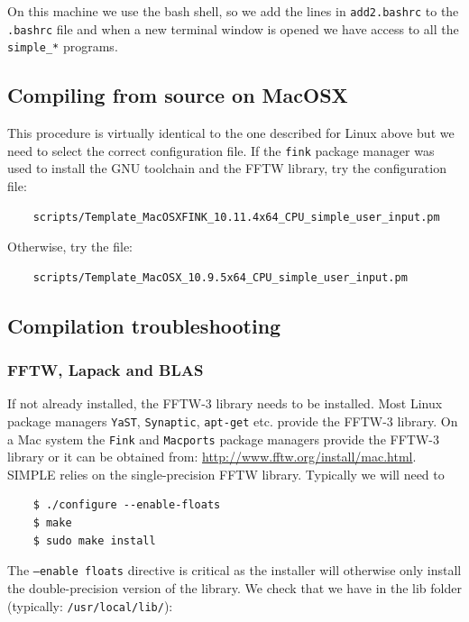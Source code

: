 \documentclass[a4paper,11pt]{article}
\begin{document}
On this machine we use the bash shell, so we add the lines in \texttt{add2.bashrc} to the \texttt{.bashrc} file and when a new terminal window is opened we have access to all the \texttt{simple\_*} programs.

\subsection{Compiling from source on MacOSX}
\label{compilemac}

This procedure is virtually identical to the one described for Linux above but we need to select the correct configuration file. If the \texttt{fink} package manager was used to install the GNU toolchain and the FFTW library, try the configuration file:
\begin{verbatim}
    scripts/Template_MacOSXFINK_10.11.4x64_CPU_simple_user_input.pm
\end{verbatim}
 Otherwise, try the file:
\begin{verbatim}
    scripts/Template_MacOSX_10.9.5x64_CPU_simple_user_input.pm
\end{verbatim}

\subsection{Compilation troubleshooting}
\label{compiletrouble}

\subsubsection{FFTW, Lapack and BLAS}

If not already installed, the FFTW-3 library needs to be installed. Most Linux package managers \texttt{YaST}, \texttt{Synaptic}, \texttt{apt-get} etc. provide the FFTW-3 library. On a Mac system the \texttt{Fink} and \texttt{Macports} package managers provide the FFTW-3 library or it can be obtained from: \url{http://www.fftw.org/install/mac.html}. SIMPLE relies on the single-precision FFTW library. Typically we will need to
\begin{verbatim}
    $ ./configure --enable-floats
    $ make
    $ sudo make install
\end{verbatim}

The \texttt{--enable floats} directive is critical as the installer will otherwise only install the double-precision version of the library. We check that we have in the lib folder (typically: \texttt{/usr/local/lib/}):
\end{document}
